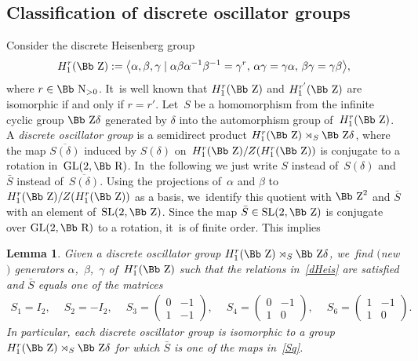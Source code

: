 \documentclass[pdftex]{sigma}
\newcommand\RR{{\mbox{\Bb R}}}
\newcommand\NN{{\mbox{\Bb N}}}
\newcommand\ZZ{{\mbox{\Bb Z}}}
\newcommand{\GL}{\mathop{{\rm GL}}}
\newcommand{\SL}{\mathop{{\rm SL}}}
\newcommand\la{\langle}
\newcommand\ra{\rangle}
\numberwithin{equation}{section}
\newtheorem{Lemma}[Theorem]{Lemma}
\begin{document}
\subsection{Classification of discrete oscillator groups}
\label{S41}
Consider the discrete Heisenberg group
\begin{gather}\label{dHeis}
H_1^r(\ZZ):=\big\la \alpha, \beta, \gamma \mid \alpha \beta \alpha^{-1} \beta^{-1} =\gamma^r,\, \alpha \gamma=\gamma \alpha,\, \beta\gamma=\gamma\beta\big\ra,
\end{gather}
where $r\in\NN_{>0}$. It~is well known that $H_1^r(\ZZ)$ and $H_1^{r'}(\ZZ)$ are isomorphic if and only if $r=r'$.
Let~$S$ be a homomorphism from the infinite cyclic group $\ZZ \delta$ generated by $\delta$ into the automorphism group of~$H_1^r(\ZZ)$.
A {\it discrete oscillator group} is a semidirect product $H_1^r(\ZZ)\rtimes_S \ZZ \delta$, where the map $\overline{S(\delta)}$ induced by $S(\delta)$ on~$H_1^r(\ZZ)/Z(H_1^r(\ZZ))$ is conjugate to a rotation in~$\GL(2,\RR)$. In~the following we just write $S$ instead of~$S(\delta)$ and $\bar S$ instead of~$\overline{ S(\delta)}$. Using the projections
of~$\alpha$ and $\beta$ to $H_1^r(\ZZ)/Z(H_1^r(\ZZ))$ as a basis, we~identify this quotient with $\ZZ^2$ and $\bar S$ with an element of~$\SL(2,\ZZ)$. Since the map $\bar S\in \SL(2,\ZZ)$ is conjugate over $\GL(2,\RR)$ to a rotation, it~is of finite order. This implies
%
\begin{Lemma}\label{lmgen}
Given a discrete oscillator group $H_1^r(\ZZ)\rtimes_S \ZZ \delta$, we~find $($new$)$ generators $\alpha$,~$\beta$,~$\gamma$ of~$H_1^r(\ZZ)$ such that the relations in~\eqref{dHeis} are satisfied and $\bar S$ equals one of the matrices
\begin{gather}\label{Sq}
S_1=I_2,\quad\
S_2=-I_2,\quad\
S_3= \begin{pmatrix} 0&-1\\1&-1 \end{pmatrix}\!,\quad\
S_4=\begin{pmatrix} 0&-1\\1&0 \end{pmatrix}\!,\quad\
S_6= \begin{pmatrix} 1&-1\\1&0 \end{pmatrix}\!.
\end{gather}
In particular, each discrete oscillator group is isomorphic to a group $H_1^r(\ZZ)\rtimes_S \ZZ \delta$ for which $\bar S$ is one of the maps in~\eqref{Sq}.
\end{Lemma}
\end{document}
